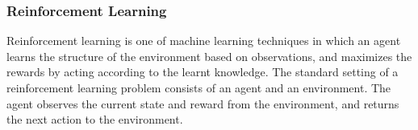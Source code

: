 \subsubsection{Reinforcement Learning}
Reinforcement learning is one of machine learning techniques in which an agent learns the structure of the environment based on observations, and maximizes the rewards by acting according to the learnt knowledge.
%
%
%
The standard setting of a reinforcement learning problem consists of an agent and an environment. %
The agent observes the current state and reward from the environment, and returns the next action to the environment.
%
